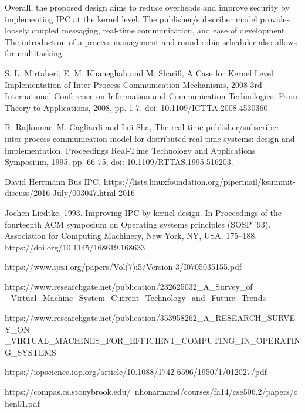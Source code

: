 \documentclass[12pt]{report}
\begin{document}
    Overall, the proposed design aims to reduce overheads and improve security by implementing IPC at the kernel level. The publisher/subscriber model provides loosely 
    coupled messaging, real-time communication, and ease of development. The introduction of a process management and round-robin scheduler also allows for multitasking.



	\pagebreak
	\begin{thebibliography}{9}
		S. L. Mirtaheri, E. M. Khaneghah and M. Sharifi, 
		A Case for Kernel Level Implementation of Inter Process Communication Mechanisms,
		2008 3rd International Conference on Information and Communication Technologies: From Theory to Applications, 
		2008, pp. 1-7, doi: 10.1109/ICTTA.2008.4530360.
	
		R. Rajkumar, M. Gagliardi and Lui Sha, 
		The real-time publisher/subscriber inter-process communication model for distributed real-time systems: design and implementation, 
		Proceedings Real-Time Technology and Applications Symposium, 
		1995, pp. 66-75, doi: 10.1109/RTTAS.1995.516203. 

		David Herrmann
		Bus IPC, https://lists.linuxfoundation.org/pipermail/ksummit-discuss/2016-July/003047.html
		2016
		
		Jochen Liedtke. 1993. 
		Improving IPC by kernel design. In Proceedings of the fourteenth ACM symposium on Operating systems principles (SOSP '93). 
		Association for Computing Machinery, 
		New York, NY, USA, 175–188. 
		https://doi.org/10.1145/168619.168633

        https://www.ijesi.org/papers/Vol(7)i5/Version-3/I0705035155.pdf

        https://www.researchgate.net/publication/232625032\_A\_Survey\_of
        \_Virtual\_Machine\_System\_Current\_Technology\_and\_Future\_Trends

    https://www.researchgate.net/publication/353958262\_A\_RESEARCH\_SURVEY\_ON
    \_VIRTUAL\_MACHINES\_FOR\_EFFICIENT\_COMPUTING\_IN\_OPERATING\_SYSTEMS

    https://iopscience.iop.org/article/10.1088/1742-6596/1950/1/012027/pdf
 
    https://compas.cs.stonybrook.edu/~nhonarmand/courses/fa14/cse506.2/papers/chen01.pdf

	\end{thebibliography}
\end{document}
